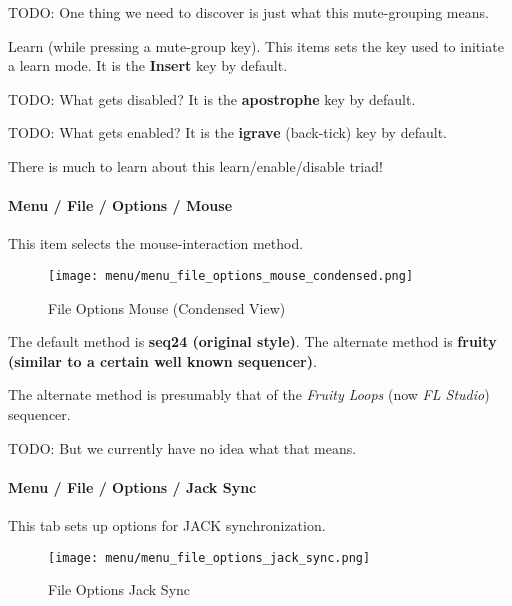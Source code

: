    TODO: One thing we need to discover is just what this mute-grouping
   means.

   Learn (while pressing a mute-group key).
   This items sets the key used to initiate a learn mode.
   It is the \textbf{Insert} key by default.

   TODO: What gets disabled?
   It is the \textbf{apostrophe} key by default.

   TODO: What gets enabled?
   It is the \textbf{igrave} (back-tick) key by default.

   There is much to learn about this learn/enable/disable triad!

\paragraph{Menu / File / Options / Mouse }
\label{paragraph:seq24_menu_file_options_mouse}

   This item selects the mouse-interaction method.

\begin{figure}[H]
   \centering 
   \texttt{[image: menu/menu\_file\_options\_mouse\_condensed.png]}
   \caption{File Options Mouse (Condensed View)}
   \label{fig:seq24_menu_file_options_mouse}
\end{figure}

   The default method is \textbf{seq24 (original style)}.
   The alternate method is \textbf{fruity (similar to a certain well known
   sequencer)}.

   The alternate method is presumably that of the \textsl{Fruity Loops}
   (now \textsl{FL Studio}) sequencer.
   
   TODO: But we currently have no idea what that means.

\paragraph{Menu / File / Options / Jack Sync }
\label{paragraph:seq24_menu_file_options_jack_sync}

   This tab sets up options for JACK synchronization.

\begin{figure}[H]
   \centering 
   \texttt{[image: menu/menu\_file\_options\_jack\_sync.png]}
   \caption{File Options Jack Sync}
   \label{fig:seq24_menu_file_options_jack_sync}
\end{figure}

